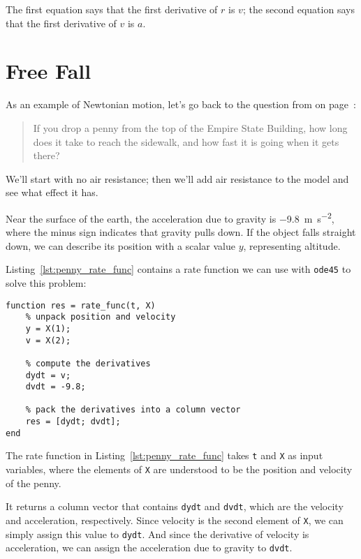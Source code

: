 The first equation says that the first derivative of $r$ is $v$;
the second equation says that the first derivative of $v$ is $a$.


\section{Free Fall}
\label{freefall}

As an example of Newtonian motion, let's go back to the question from  on page~\pageref{penny}:

\begin{quote}
If you drop a penny from the top of the Empire State Building, how long does it take to reach the sidewalk, and how fast it is going when it gets there?
\end{quote}

We'll start with no air resistance; then we'll add air resistance to the model and see what effect it has.


Near the surface of the earth, the
acceleration due to gravity is \SI{-9.8}{\meter \per \second \squared}, where the minus sign
indicates that gravity pulls down.
If the object falls straight down, we can describe its position with a
scalar value $y$, representing altitude.

Listing~\ref{lst:penny_rate_func} contains a rate function we can use with \lstinline{ode45} to solve
this problem:

\begin{lstlisting}[caption={A rate function for the falling penny problem}, label={lst:penny_rate_func}]
function res = rate_func(t, X)
    % unpack position and velocity
    y = X(1);      
    v = X(2);      
    
    % compute the derivatives
    dydt = v;
    dvdt = -9.8;

    % pack the derivatives into a column vector
    res = [dydt; dvdt];
end
\end{lstlisting}

The rate function in Listing~\ref{lst:penny_rate_func} takes \lstinline{t} and \lstinline{X} as input variables, where the elements of \lstinline{X} are understood to be the position and velocity of the penny.

It returns a column vector that contains \lstinline{dydt} and \lstinline{dvdt}, which
are the velocity and acceleration, respectively.
Since velocity is the second element of \lstinline{X}, we can simply assign this value to \lstinline{dydt}.
And since the derivative of velocity is acceleration, we can assign the acceleration due to gravity to \lstinline{dvdt}.

